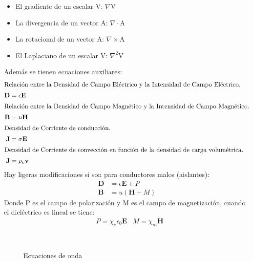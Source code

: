 \documentclass[12pt,fleqn,a4paper,]{LegrandOrangeBook}
\begin{document}
\begin{itemize}
\item El gradiente de un escalar V: $\nabla$V
\item La divergencia de un vector A: $\nabla\cdot$A
\item La rotacional de un vector A: $\nabla\times$A
\item El Laplaciano de un escalar V: $\nabla^2$V
\end{itemize}
Además se tienen ecuaciones auxiliares:
\begin{subequations}
\begin{align}
\intertext{Relación entre la Densidad de Campo Eléctrico y la Intensidad de Campo Eléctrico.}
\textbf{D}&= \epsilon \textbf{E}\\
\intertext{Relación entre la Densidad de Campo Magnético y la Intensidad de Campo Magnético.}
\textbf{B}&=u\textbf{H}\\
\intertext{Densidad de Corriente de conducción.}
\textbf{J}&=\sigma\textbf{E}\\
\intertext{Densidad de Corriente de convección en función de la densidad de carga volumétrica.}
\textbf{J}&=\rho_v\textbf{v}
\end{align}
\end{subequations}
Hay ligeras modificaciones si son para conductores malos (aislantes):
\begin{subequations}
\begin{align}
\textbf{D}&= \epsilon \textbf{E} + P\\
\textbf{B}&=u(\textbf{H} + M)
\end{align}
\end{subequations}
Donde P es el campo de polarización y M es el campo de magnetización, cuando el dieléctrico es lineal se tiene:
\begin{align*}
&P=\chi_e\epsilon_0\textbf{E} &M=\chi_m\textbf{H}
\end{align*}
\begin{figure}[H]
\centering
{}\\
\caption{Ecuaciones de onda}
\end{figure}
\end{document}
